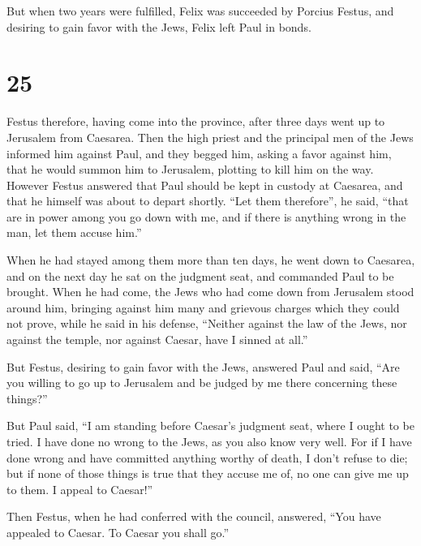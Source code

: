  But when two years were fulfilled, Felix was succeeded
by Porcius Festus, and desiring to gain favor with the Jews, Felix left
Paul in bonds.

\hypertarget{section-24}{%
\section{25}\label{section-24}}

 Festus therefore, having come into the province, after
three days went up to Jerusalem from Caesarea.  Then the
high priest and the principal men of the Jews informed him against Paul,
and they begged him,  asking a favor against him, that he
would summon him to Jerusalem, plotting to kill him on the way.
 However Festus answered that Paul should be kept in
custody at Caesarea, and that he himself was about to depart shortly.
 ``Let them therefore'', he said, ``that are in power
among you go down with me, and if there is anything wrong in the man,
let them accuse him.''

 When he had stayed among them more than ten days, he went
down to Caesarea, and on the next day he sat on the judgment seat, and
commanded Paul to be brought.  When he had come, the Jews
who had come down from Jerusalem stood around him, bringing against him
many and grievous charges which they could not prove, 
while he said in his defense, ``Neither against the law of the Jews, nor
against the temple, nor against Caesar, have I sinned at all.''

 But Festus, desiring to gain favor with the Jews,
answered Paul and said, ``Are you willing to go up to Jerusalem and be
judged by me there concerning these things?''

 But Paul said, ``I am standing before Caesar's judgment
seat, where I ought to be tried. I have done no wrong to the Jews, as
you also know very well.  For if I have done wrong and
have committed anything worthy of death, I don't refuse to die; but if
none of those things is true that they accuse me of, no one can give me
up to them. I appeal to Caesar!''

 Then Festus, when he had conferred with the council,
answered, ``You have appealed to Caesar. To Caesar you shall go.''

